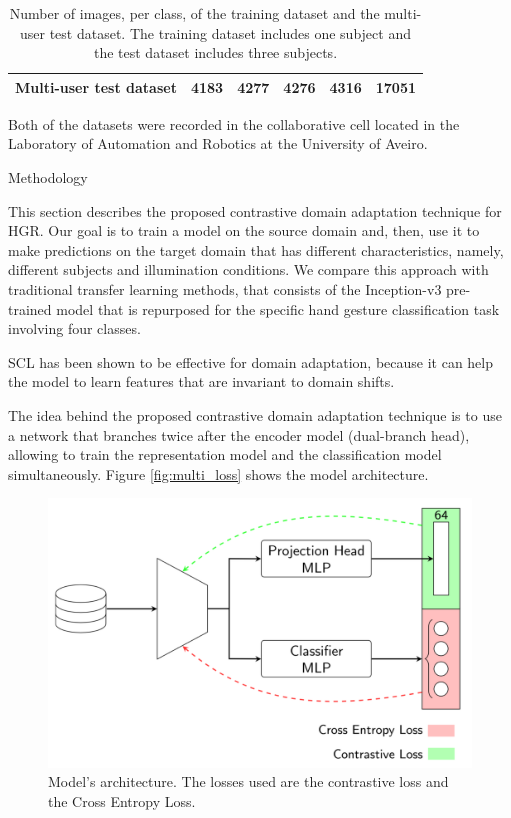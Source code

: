 \documentclass[final]{beamer}
\newlength{\colwidth}
\begin{document}
\begin{frame}[t]
\begin{columns}[t]
\begin{column}{\colwidth}
\begin{table}[!ht]
\begin{tabular}{lccccc}
      Multi-user test dataset & \num{4183} & \num{4277} & \num{4276} & \num{4316} & \textbf{\num{17051}}\\
      \bottomrule
    \end{tabular}
    \caption{Number of images, per class, of the training dataset and the multi-user test dataset. The training dataset includes one subject and the test dataset includes three subjects.\label{tab:dataset}}
  \end{table}

  Both of the datasets were recorded in the collaborative cell located in 
  the Laboratory of Automation and Robotics at the University of Aveiro.

  \begin{block}{Methodology}

    This section describes the proposed contrastive domain adaptation technique for HGR. 
    Our goal is to train a model on the source domain and, then, use it to make
    predictions on the target domain that has different characteristics, namely, different subjects
    and illumination conditions. We compare this approach with traditional transfer learning methods, that 
    consists of the Inception-v3 pre-trained model that is repurposed
    for the specific hand gesture classification task involving four classes.

    SCL has been shown to be effective for domain adaptation, 
    because it can help the model to learn features that are invariant to domain shifts.
    
    The idea behind the proposed contrastive domain adaptation technique is to use a network that 
    branches twice after the encoder model (dual-branch head), allowing to train the representation 
    model and the classification model simultaneously. Figure \autoref{fig:multi_loss} shows the model architecture.

    \begin{figure}[!ht]
      \centering
      \includegraphics[width=\textwidth]{img/architecture.png}
      \caption{Model's architecture. The losses used are the contrastive loss and the Cross Entropy Loss. \label{fig:multi_loss}}
    \end{figure} 


\end{block}
\end{column}
\end{columns}
\end{frame}
\end{document}
